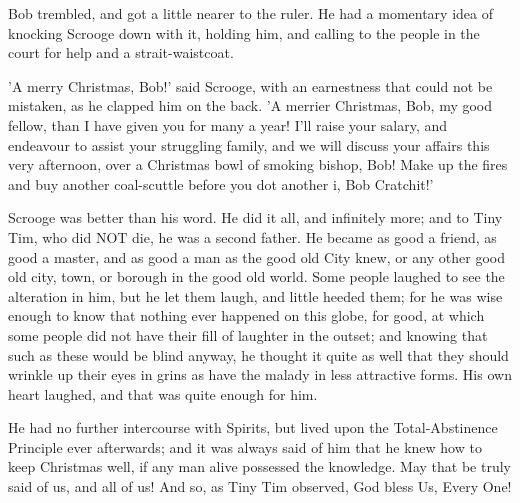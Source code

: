 Bob trembled, and got a little nearer to the ruler. He had a momentary
idea of knocking Scrooge down with it, holding him, and calling to the
people in the court for help and a strait-waistcoat.

'A merry Christmas, Bob!' said Scrooge, with an earnestness that could
not be mistaken, as he clapped him on the back. 'A merrier Christmas,
Bob, my good fellow, than I have given you for many a year! I'll raise
your salary, and endeavour to assist your struggling family, and we will
discuss your affairs this very afternoon, over a Christmas bowl of
smoking bishop, Bob! Make up the fires and buy another coal-scuttle
before you dot another i, Bob Cratchit!'


Scrooge was better than his word. He did it all, and infinitely more;
and to Tiny Tim, who did NOT die, he was a second father. He became as
good a friend, as good a master, and as good a man as the good old
City knew, or any other good old city, town, or borough in the good old
world. Some people laughed to see the alteration in him, but he let them
laugh, and little heeded them; for he was wise enough to know that
nothing ever happened on this globe, for good, at which some people did
not have their fill of laughter in the outset; and knowing that such as
these would be blind anyway, he thought it quite as well that they
should wrinkle up their eyes in grins as have the malady in less
attractive forms. His own heart laughed, and that was quite enough for
him.

He had no further intercourse with Spirits, but lived upon the
Total-Abstinence Principle ever afterwards; and it was always said of
him that he knew how to keep Christmas well, if any man alive possessed
the knowledge. May that be truly said of us, and all of us! And so, as
Tiny Tim observed, God bless Us, Every One!
